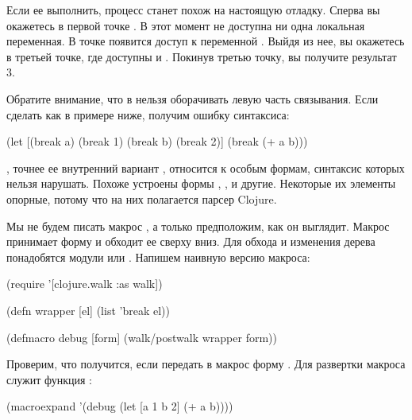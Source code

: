 \begin{english}
\end{english}

Если ее выполнить, процесс станет похож на настоящую отладку. Сперва вы окажетесь в первой точке . В этот момент не доступна ни одна локальная переменная. В точке  появится доступ к переменной . Выйдя из нее, вы окажетесь в третьей точке, где доступны  и . Покинув третью точку, вы получите результат 3.

Обратите внимание, что в  нельзя оборачивать левую часть связывания. Если сделать как в примере ниже, получим ошибку синтаксиса:

\begin{english}
  \begin{clojure}
(let [(break a) (break 1)
      (break b) (break 2)]
  (break (+ a b)))
  \end{clojure}
\end{english}

, точнее ее внутренний вариант , относится к особым формам, синтаксис которых нельзя нарушать. Похоже устроены формы , ,  и другие. Некоторые их элементы опорные, потому что на них полагается парсер Clojure.

Мы не будем писать макрос , а только предположим, как он выглядит. Макрос принимает форму и обходит ее сверху вниз. Для обхода и изменения дерева понадобятся модули  или . Напишем наивную версию макроса:

\begin{english}
  \begin{clojure}
(require
  '[clojure.walk :as walk])

(defn wrapper
  [el]
  (list 'break el))

(defmacro debug
  [form]
  (walk/postwalk wrapper form))
  \end{clojure}
\end{english}

Проверим, что получится, если передать в макрос форму . Для развертки макроса служит функция :

\begin{english}
  \begin{clojure}
(macroexpand
 '(debug
   (let [a 1 b 2]
     (+ a b))))
  \end{clojure}
\end{english}

